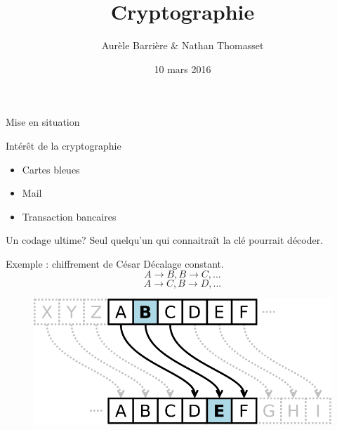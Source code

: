 \documentclass{beamer}
\author{Aurèle Barrière \& Nathan Thomasset}
\title{Cryptographie}
\date{10 mars 2016}
\begin{document}
\begin{frame}
\maketitle
\end{frame}

\begin{frame}{Mise en situation}
  \end{frame}

\begin{frame}{Intérêt de la cryptographie}
  \begin{itemize}
  \item Cartes bleues
    
  \item Mail
    
  \item Transaction bancaires
\end{itemize}
\end{frame}

\begin{frame}{Un codage ultime?}
  Seul quelqu'un qui connaitraît la clé pourrait décoder.
  \end{frame}

\begin{frame}{Exemple : chiffrement de César}
  Décalage constant. 
$$A\rightarrow B, B\rightarrow C, \text{...}$$ 
$$A\rightarrow C, B\rightarrow D, \text{...}$$

  \begin{figure}
    \centering
  \includegraphics[scale = 0.25]{cesar.png}
\end{figure}
\end{frame}
\end{document}
